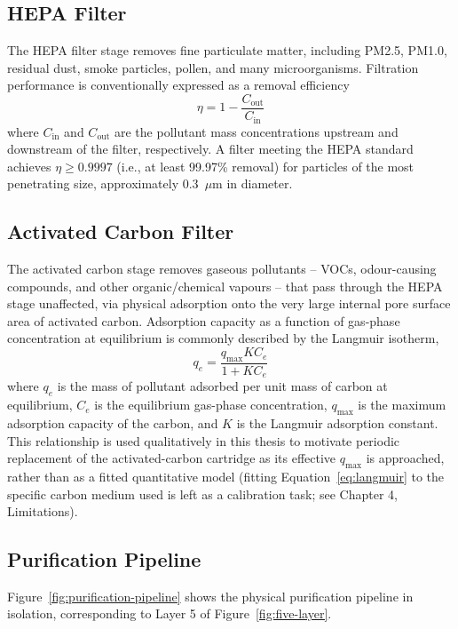 \subsection{HEPA Filter}
The HEPA filter stage removes fine particulate matter, including PM2.5, PM1.0, residual dust, smoke particles, pollen, and many microorganisms. Filtration performance is conventionally expressed as a removal efficiency
\begin{equation}
\eta = 1 - \frac{C_{\text{out}}}{C_{\text{in}}}
\label{eq:hepa-efficiency}
\end{equation}
where $C_{\text{in}}$ and $C_{\text{out}}$ are the pollutant mass concentrations upstream and downstream of the filter, respectively. A filter meeting the HEPA standard achieves $\eta \geq 0.9997$ (i.e., at least 99.97\% removal) for particles of the most penetrating size, approximately 0.3~$\mu$m in diameter.

\subsection{Activated Carbon Filter}
The activated carbon stage removes gaseous pollutants -- VOCs, odour-causing compounds, and other organic/chemical vapours -- that pass through the HEPA stage unaffected, via physical adsorption onto the very large internal pore surface area of activated carbon. Adsorption capacity as a function of gas-phase concentration at equilibrium is commonly described by the Langmuir isotherm,
\begin{equation}
q_e = \frac{q_{\max} K C_e}{1 + K C_e}
\label{eq:langmuir}
\end{equation}
where $q_e$ is the mass of pollutant adsorbed per unit mass of carbon at equilibrium, $C_e$ is the equilibrium gas-phase concentration, $q_{\max}$ is the maximum adsorption capacity of the carbon, and $K$ is the Langmuir adsorption constant. This relationship is used qualitatively in this thesis to motivate periodic replacement of the activated-carbon cartridge as its effective $q_{\max}$ is approached, rather than as a fitted quantitative model (fitting Equation~\ref{eq:langmuir} to the specific carbon medium used is left as a calibration task; see Chapter 4, Limitations).

\subsection{Purification Pipeline}
Figure~\ref{fig:purification-pipeline} shows the physical purification pipeline in isolation, corresponding to Layer 5 of Figure~\ref{fig:five-layer}.

